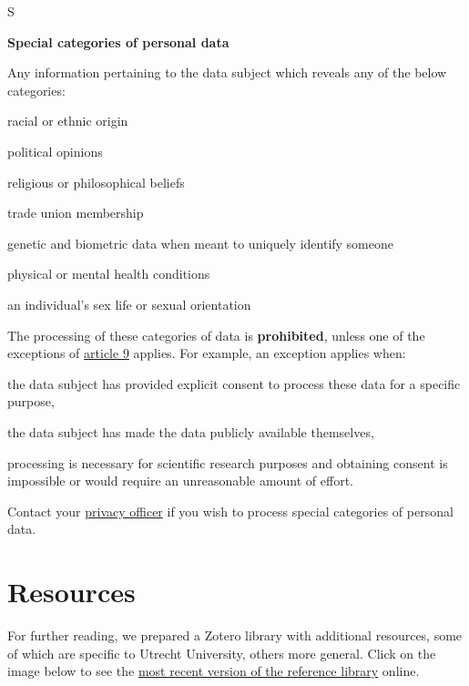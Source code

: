 \documentclass[
]{book}
\begin{document}
S

\textbf{Special categories of personal data}

Any information pertaining to the data subject which reveals any of the below categories:

racial or ethnic origin

political opinions

religious or philosophical beliefs

trade union membership

genetic and biometric data when meant to uniquely identify someone

physical or mental health conditions

an individual's sex life or sexual orientation

The processing of these categories of data is \textbf{prohibited}, unless one of the exceptions of \href{https://gdpr-info.eu/art-9-gdpr/}{article 9} applies. For example, an exception applies when:

the data subject has provided explicit consent to process these data for a specific purpose,

the data subject has made the data publicly available themselves,

processing is necessary for scientific research purposes and obtaining consent is impossible or would require an unreasonable amount of effort.

Contact your \protect\hyperlink{support}{privacy officer} if you wish to process special categories of personal data.

\hypertarget{references}{%
\chapter{Resources}\label{references}}

For further reading, we prepared a Zotero library with additional resources, some
of which are specific to Utrecht University, others more general. Click on the
image below to see the
\href{https://www.zotero.org/groups/2554340/data_privacy_uu/library}{most recent version of the reference library}
online.
\end{document}
